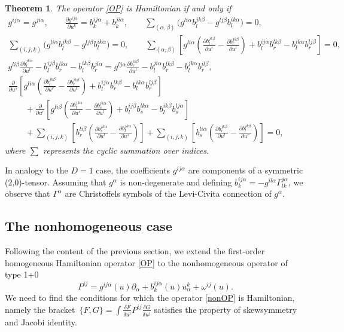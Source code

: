 \documentclass[10pt,a4paper]{amsart}
\numberwithin{equation}{section}
\newtheorem{Theorem}{Theorem}[section]
\begin{document}
\begin{Theorem}
The operator \eqref{OP} is Hamiltonian if and only if
\begin{gather}
 g^{ij\alpha}=g^{ji\alpha},\qquad
 \frac{\partial g^{ij\alpha}}{\partial u^k}=b^{ij\alpha}_k+b^{ji\alpha}_k,\qquad
 \sum_{(\alpha,\beta)}\big(g^{li\alpha}b^{jk\beta}_l-g^{lj\beta}b^{ik\alpha}_l\big)=0,\nonumber\\
 \sum_{(i,j,k)}\big(g^{li\alpha}b^{jk\beta}_l-g^{lj\beta}b^{ik\alpha}_l\big)=0,\qquad
 \sum_{(\alpha,\beta)}\left[g^{li\alpha}\left(\frac{\partial b^{jk\beta}_l}{\partial u^r}-\frac{\partial b^{jk\beta}_r}{\partial u^l} \right)+b^{ij\alpha}_lb^{lk\beta}_r-b^{ik\alpha}_lb^{lj\beta}_r\right]=0,\nonumber\\
 g^{li\beta}\frac{\partial b^{jk\alpha}_r}{\partial u^l}-b^{ij\beta}_lb^{lk\alpha}_r-b^{ik\beta}_lb^{jl\alpha}_r=g^{lj\alpha}\frac{\partial b^{ik\beta}_r}{\partial u^l}-b^{ji\alpha}_lb^{lk\beta}_r-b^{jk\alpha}_lb^{il\beta}_r,\nonumber\\
 \frac{\partial}{\partial u^s}\left[g^{li\alpha}\left(\frac{\partial b^{jk\beta}_l}{\partial u^r}-\frac{\partial b^{jk\beta}_r}{\partial u^l}\right)+b^{ij\alpha}_lb^{lk\beta}_r-b^{ik\alpha}_lb^{lj\beta}_r\right] \nonumber \\
 \qquad+\frac{\partial}{\partial u^r}\left[g^{li\beta}\left(\frac{\partial b^{jk\alpha}_l}{\partial u^s}-\frac{\partial b^{jk\alpha}_s}{\partial u^l}\right)+b^{ij\beta}_lb^{lk\alpha}_s-b^{ik\beta}_lb^{lj\alpha}_s\right] \nonumber \\
\qquad +\sum_{(i,j,k)}\left[b^{li\beta}_r\left(\frac{\partial b^{jk\alpha}_s}{\partial u^l}-\frac{\partial b^{jk\alpha}_l}{\partial u^s}\right)\right] +\sum_{(i,j,k)}\left[b^{li\alpha}_s\left(\frac{\partial b^{jk\beta}_r}{\partial u^l}-\frac{\partial b^{jk\beta}_l}{\partial u^r}\right)\right]=0,\label{con1}
\end{gather}
where $\sum$ represents the cyclic summation over indices.
\end{Theorem}

In analogy to the $D=1$ case, the coefficients $g^{ij\alpha}$ are components of a symmetric (2,0)-tensor. Assuming that $g^\alpha$ is non-degenerate and defining $b^{ij\alpha}_k=-g^{il\alpha}\Gamma^{j\alpha}_{lk}$, we observe that $\Gamma^\alpha$ are Christoffels symbols of the Levi-Civita connection of $g^\alpha$.

\subsection {The nonhomogeneous case}
Following the content of the previous section, we extend the first-order homogeneous Hamiltonian operator \eqref{OP} to the nonhomogeneous operator of type 1+0
\begin{equation}\label{nonOP}
P^{ij}=g^{ij\alpha}(u)\partial_\alpha+b^{ij\alpha}_k(u)u^k_\alpha+\omega^{ij}(u).
\end{equation}
We need to find the conditions for which the operator \eqref{nonOP} is Hamiltonian, namely the brack\-et~${\lbrace F,G\rbrace=\int \frac{\delta F}{\delta u^i}P^{ij}\frac{\delta G}{\delta u^j}}$ satisfies the property of skewsymmetry and Jacobi identity.
\end{document}
